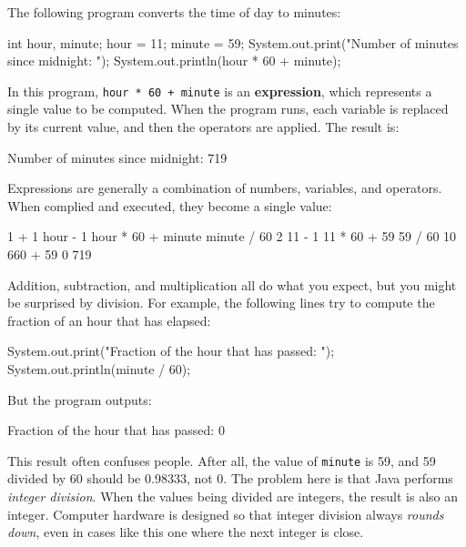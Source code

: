 \documentclass[12pt]{book}
\theoremstyle{exercise}
\newcommand{\java}[1]{\verb"#1"}
\newcommand{\java}[1]{\lstinline{#1}} %
\begin{document}
The following program converts the time of day to minutes:

\begin{code}
    int hour, minute;
    hour = 11;
    minute = 59;
    System.out.print("Number of minutes since midnight: ");
    System.out.println(hour * 60 + minute);
\end{code}


In this program, \java{hour * 60 + minute} is an {\bf expression}, which represents a single value to be computed.
When the program runs, each variable is replaced by its current value, and then the operators are applied.
The result is:

\begin{stdout}
Number of minutes since midnight: 719
\end{stdout}

Expressions are generally a combination of numbers, variables, and operators.
When complied and executed, they become a single value:

\begin{code}
    1 + 1     hour - 1     hour * 60 + minute     minute / 60
    2         11 - 1       11 * 60 + 59           59 / 60
              10           660 + 59               0
                           719
\end{code}

Addition, subtraction, and multiplication all do what you expect, but you might be surprised by division.
For example, the following lines try to compute the fraction of an hour that has elapsed:

\begin{code}
    System.out.print("Fraction of the hour that has passed: ");
    System.out.println(minute / 60);
\end{code}

But the program outputs:

\begin{stdout}
Fraction of the hour that has passed: 0
\end{stdout}


This result often confuses people.
After all, the value of \java{minute} is 59, and 59 divided by 60 should be 0.98333, not 0.
The problem here is that Java performs {\em integer division}.
When the values being divided are integers, the result is also an integer.
Computer hardware is designed so that integer division always {\em rounds down}, even in cases like this one where the next integer is close.
\end{document}
